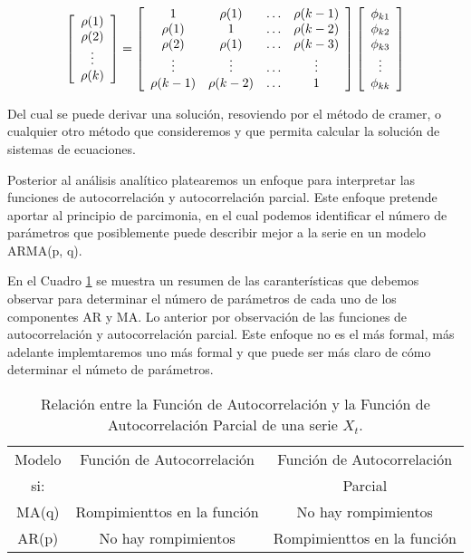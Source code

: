 \documentclass[
  a4paper,
]{article}
\begin{document}
\[
    \left[ 
    \begin{array}{c}
        \rho(1) \\
        \rho(2) \\
        \vdots \\
        \rho(k)
    \end{array} 
    \right]
    = 
    \left[ 
    \begin{array}{c c c c}
        1 & \rho(1) & \ldots & \rho(k - 1)\\
        \rho(1) & 1 & \ldots & \rho(k - 2)\\
        \rho(2) & \rho(1) & \ldots & \rho(k - 3)\\
        \vdots & \vdots & \ldots & \vdots\\
        \rho(k - 1) & \rho(k - 2) & \ldots & 1\\
    \end{array} 
    \right]
    \left[ 
    \begin{array}{c}
        \phi_{k1} \\
        \phi_{k2} \\
        \phi_{k3} \\
        \vdots \\
        \phi_{kk} \\
    \end{array} 
    \right]
\]

Del cual se puede derivar una solución, resoviendo por el método de
cramer, o cualquier otro método que consideremos y que permita calcular
la solución de sistemas de ecuaciones.

Posterior al análisis analítico platearemos un enfoque para interpretar
las funciones de autocorrelación y autocorrelación parcial. Este enfoque
pretende aportar al principio de parcimonia, en el cual podemos
identificar el número de parámetros que posiblemente puede describir
mejor a la serie en un modelo ARMA(p, q).

En el Cuadro \ref{ACF_PACF} se muestra un resumen de las caranterísticas
que debemos observar para determinar el número de parámetros de cada uno
de los componentes AR y MA. Lo anterior por observación de las funciones
de autocorrelación y autocorrelación parcial. Este enfoque no es el más
formal, más adelante implemtaremos uno más formal y que puede ser más
claro de cómo determinar el númeto de parámetros.

\begin{table}
\centering
\begin{tabular}{| c | c | c |}
    \hline
    Modelo  & Función de Autocorrelación & Función de Autocorrelación \\
     si: &   & Parcial \\
    \hline
    MA(q) & Rompimienttos en la función & No hay rompimientos \\
    AR(p) & No hay rompimientos & Rompimienttos en la función \\
    \hline
    \end{tabular}
\caption{Relación entre la Función de Autocorrelación y la Función de Autocorrelación Parcial de una serie $X_t$.}
\label{ACF_PACF}
\end{table}
\end{document}
